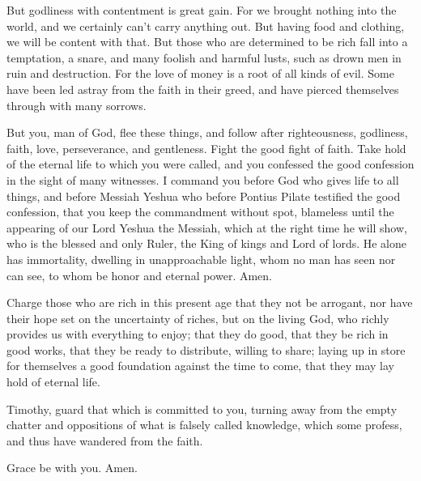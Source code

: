 \myverse{}But godliness with contentment is great gain.
\myverse{}For we brought nothing into the world, and we certainly can’t carry anything
out.
\myverse{}But having food and clothing, we will be content with that.
\myverse{}But those who are determined to be rich fall into a temptation, a snare, and
many foolish and harmful lusts, such as drown men in ruin and destruction.
\myverse{}For the love of money is a root of all kinds of evil. Some have been led astray
from the faith in their greed, and have pierced themselves through with many sorrows.

\myverse{}But you, man of God, flee these things, and follow after righteousness,
godliness, faith, love, perseverance, and gentleness.
\myverse{}Fight the good fight of faith. Take hold of the eternal life to which you
were called, and you confessed the good confession in the sight of many witnesses.
\myverse{}I command you before God who gives life to all things, and before Messiah
Yeshua who before Pontius Pilate testified the good confession,
\myverse{}that you keep the commandment without spot, blameless until the appearing
of our Lord Yeshua the Messiah,
\myverse{}which at the right time he will show, who is the blessed and only Ruler, the
King of kings and Lord of lords.
\myverse{}He alone has immortality, dwelling in unapproachable light, whom no man has
seen nor can see, to whom be honor and eternal power. Amen.

\myverse{}Charge those who are rich in this present age that they not be
arrogant, nor have their hope set on the uncertainty of riches, but on the living God, who richly provides
us with everything to enjoy;
\myverse{}that they do good, that they be rich in good works, that they be ready to
distribute, willing to share;
\myverse{}laying up in store for themselves a good foundation against the time to come,
that they may lay hold of eternal life.

\myverse{}Timothy, guard that which is committed to you, turning away from
the empty chatter and oppositions of what is falsely called knowledge,
\myverse{}which some profess, and thus have wandered from the faith.

Grace be with you. Amen.



